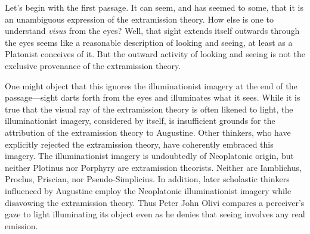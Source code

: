 \documentclass[12pt]{article}
\begin{document}
Let's begin with the first passage. It can seem, and has seemed to some, that it is an unambiguous expression of the extramission theory. How else is one to understand \emph{visus} from the eyes? Well, that sight extends itself outwards through the eyes seems like a reasonable description of looking and seeing, at least as a Platonist conceives of it. But the outward activity of looking and seeing is not the exclusive provenance of the extramission theory. 

One might object that this ignores the illuminationist imagery at the end of the passage---sight darts forth from the eyes and illuminates what it sees. While it is true that the visual ray of the extramission theory is often likened to light, the illuminationist imagery, considered by itself, is insufficient grounds for the attribution of the extramission theory to Augustine. Other thinkers, who have explicitly rejected the extramission theory, have coherently embraced this imagery. The illuminationist imagery is undoubtedly of Neoplatonic origin, but neither Plotinus nor Porphyry are extramission theorists. Neither are Iamblichus, Proclus, Priscian, nor Pseudo-Simplicius. In addition, later scholastic thinkers influenced by Augustine employ the Neoplatonic illuminationist imagery while disavowing the extramission theory. Thus Peter John Olivi compares a perceiver's gaze to light illuminating its object even as he denies that seeing involves any real emission. 
\end{document}

